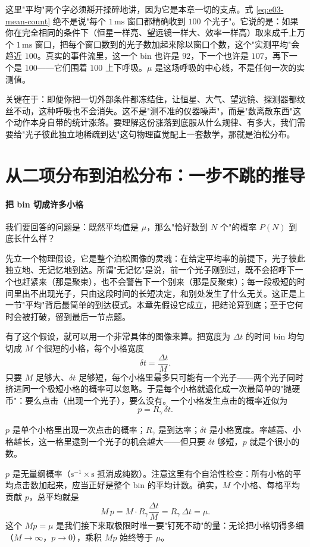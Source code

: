 这里"平均"两个字必须掰开揉碎地讲，因为它是本章一切的支点。式 \eqref{eq:e03-mean-count} 绝不是说"每个 $1\,\mathrm{ms}$ 窗口都精确收到 $100$ 个光子"。它说的是：如果你在完全相同的条件下（恒星一样亮、望远镜一样大、效率一样高）取来成千上万个 $1\,\mathrm{ms}$ 窗口，把每个窗口数到的光子数加起来除以窗口个数，这个"实测平均"会趋近 $100$。真实的事件流里，这一个 bin 也许是 $92$，下一个也许是 $107$，再下一个是 $100$——它们围着 $100$ 上下呼吸。$\mu$ 是这场呼吸的中心线，不是任何一次的实测值。

关键在于：即便你把一切外部条件都冻结住，让恒星、大气、望远镜、探测器都纹丝不动，这种呼吸也不会消失。这不是"测不准的仪器噪声"，而是"数离散东西"这个动作本身自带的统计涨落。要理解这份涨落到底服从什么规律、有多大，我们需要给"光子彼此独立地稀疏到达"这句物理直觉配上一套数学，那就是泊松分布。

\section{从二项分布到泊松分布：一步不跳的推导}
\label{sec:e03-poisson}

\paragraph{把 bin 切成许多小格}

我们要回答的问题是：既然平均值是 $\mu$，那么"恰好数到 $N$ 个"的概率 $P(N)$ 到底长什么样？

先立一个物理假设，它是整个泊松图像的灵魂：在给定平均率的前提下，光子彼此独立地、无记忆地到达。所谓"无记忆"是说，前一个光子刚到过，既不会招呼下一个也赶紧来（那是聚束），也不会警告下一个别来（那是反聚束）；每一段极短的时间里出不出现光子，只由这段时间的长短决定，和别处发生了什么无关。这正是上一节"平均"背后最简单的到达模式。本章先假设它成立，把结论算到底；至于它何时会被打破，留到最后一节点题。

有了这个假设，就可以用一个非常具体的图像来算。把宽度为 $\Delta t$ 的时间 bin 均匀切成 $M$ 个很短的小格，每个小格宽度
\[
  \delta t=\frac{\Delta t}{M}.
\]
只要 $M$ 足够大、$\delta t$ 足够短，每个小格里最多只可能有一个光子——两个光子同时挤进同一个极短小格的概率可以忽略。于是每个小格就退化成一次最简单的"抛硬币"：要么点击（出现一个光子），要么没有。一个小格发生点击的概率近似为
\begin{equation}
  p=R_\gamma\,\delta t .
  \label{eq:e03-cell-prob}
\end{equation}
\begin{formulaexplain}
$p$ 是单个小格里出现一次点击的概率；$R_\gamma$ 是到达率；$\delta t$ 是小格宽度。率越高、小格越长，这一格里逮到一个光子的机会越大——但只要 $\delta t$ 够短，$p$ 就是个很小的数。
\end{formulaexplain}
$p$ 是无量纲概率（$\mathrm{s^{-1}}\times\mathrm{s}$ 抵消成纯数）。注意这里有个自洽性检查：所有小格的平均点击数加起来，应当正好是整个 bin 的平均计数。确实，$M$ 个小格、每格平均贡献 $p$，总平均就是
\[
  M\,p=M\cdot R_\gamma\frac{\Delta t}{M}=R_\gamma\,\Delta t=\mu .
\]
这个 $Mp=\mu$ 是我们接下来取极限时唯一要"钉死不动"的量：无论把小格切得多细（$M\to\infty$，$p\to0$），乘积 $Mp$ 始终等于 $\mu$。

